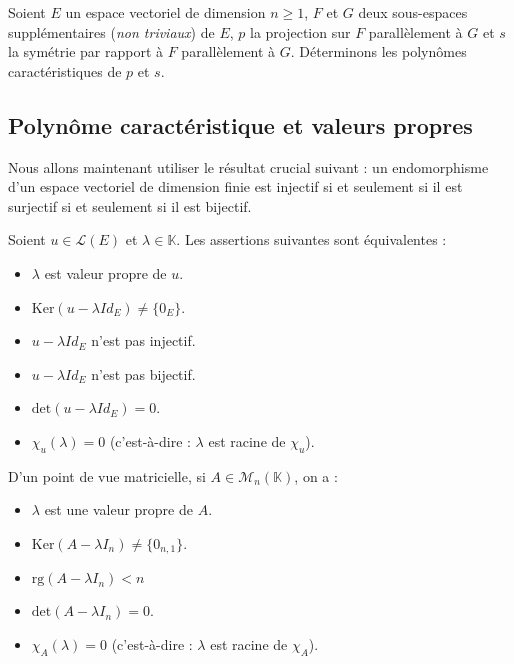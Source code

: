 \documentclass[french,11pt,twoside]{VcCours}
\begin{document}
\begin{Exemple}{} Soient $E$ un espace vectoriel de dimension $n \geq 1$, $F$ et $G$ deux sous-espaces supplémentaires (\emph{non triviaux}) de $E$, $p$ la projection sur $F$ parallèlement à $G$ et $s$ la symétrie par rapport à $F$ parallèlement à $G$. Déterminons les polynômes caractéristiques de $p$ et $s$.

\vspace{11cm}
\end{Exemple}

\newpage
\subsection{Polynôme caractéristique et valeurs propres}

Nous allons maintenant utiliser le résultat crucial suivant : un endomorphisme d'un espace vectoriel de dimension finie est injectif si et seulement si il est surjectif si et seulement si il est bijectif.


Soient $u \in \mathcal{L}(E)$ et $\lambda \in \mathbb{K}$. Les assertions suivantes sont équivalentes :

\begin{itemize}
\item $\lambda$ est valeur propre de $u$.
\item $\textrm{Ker}(u- \lambda Id_E) \neq \lbrace 0_E \rbrace$.
\item $u- \lambda Id_E$ n'est pas injectif.
\item $u- \lambda Id_E$ n'est pas bijectif.
\item $\textrm{det}(u- \lambda Id_E) = 0$.
\item $\chi_u(\lambda) = 0$ (c'est-à-dire : $\lambda$ est racine de $\chi_u$).
\end{itemize}

D'un point de vue matricielle, si $A \in \mathcal{M}_{n}(\mathbb{K})$, on a :

\begin{itemize}
\item $\lambda$ est une valeur propre de $A$.
\item $\textrm{Ker}(A- \lambda I_n) \neq \lbrace 0_{n,1} \rbrace$.
\item $\textrm{rg}(A- \lambda I_n) <n$
\item $\textrm{det}(A- \lambda I_n) = 0$.
\item $\chi_A(\lambda) = 0$ (c'est-à-dire : $\lambda$ est racine de $\chi_A$).
\end{itemize}
\end{document}
